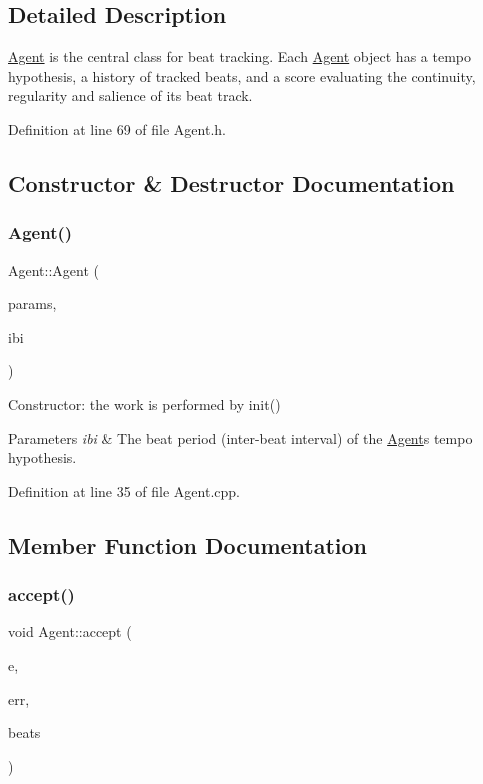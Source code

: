 \subsection{Detailed Description}
\hyperlink{class_agent}{Agent} is the central class for beat tracking. Each \hyperlink{class_agent}{Agent} object has a tempo hypothesis, a history of tracked beats, and a score evaluating the continuity, regularity and salience of its beat track. 

Definition at line 69 of file Agent.\+h.



\subsection{Constructor \& Destructor Documentation}
\mbox{\label{class_agent_a4c3a0b0e41859d59e55d087c2396baa4}} 
\subsubsection{\texorpdfstring{Agent()}{Agent()}}
{\footnotesize\ttfamily Agent\+::\+Agent (\begin{DoxyParamCaption}\item[{const \hyperlink{class_agent_parameters}{Agent\+Parameters} \&}]{params,  }\item[{double}]{ibi }\end{DoxyParamCaption})}

Constructor\+: the work is performed by init() 
\begin{DoxyParams}{Parameters}
{\em ibi} & The beat period (inter-\/beat interval) of the \hyperlink{class_agent}{Agent}\textquotesingle{}s tempo hypothesis. \\
\hline
\end{DoxyParams}


Definition at line 35 of file Agent.\+cpp.



\subsection{Member Function Documentation}
\mbox{\label{class_agent_a64b1bca4fe422141a348c20c5831a16d}} 
\subsubsection{\texorpdfstring{accept()}{accept()}}
{\footnotesize\ttfamily void Agent\+::accept (\begin{DoxyParamCaption}\item[{const \hyperlink{struct_event}{Event} \&}]{e,  }\item[{double}]{err,  }\item[{int}]{beats }\end{DoxyParamCaption})}

